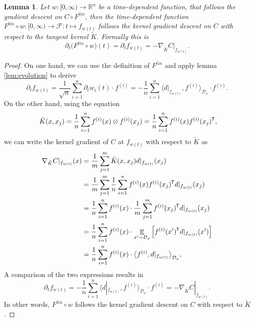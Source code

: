 \documentclass[11pt, a4paper]{article}
\newtheorem{lemma}[theorem]{Lemma}
\newcommand{\R}{\mathbb{R}}
\newcommand{\D}{\mathcal{D}}
\newcommand{\F}{\mathcal{F}}
\newcommand*{\tr}{^{\mkern-1.5mu\mathsf{T}}}
\DeclareMathOperator*{\E}{\mathbb{E}}
\begin{document}
\begin{lemma} \label{lem:tk}
Let $w: [0, \infty) \to \R^n$ be a time-dependent function, that follows the gradient descent on $C \circ F^\textit{lin}$, then the time-dependent function $F^\textit{lin} \circ w : [0, \infty) \to \F : t \mapsto f_{w(t)}$ follows the kernel gradient descent on $C$ with respect to the tangent kernel $\tilde{K}$. Formally this is
\[ \partial_t \big (F^\textit{lin} \circ w \big )(t) = \partial_tf_{w(t)} = -\nabla_{\tilde{K}}C|_{f_{w(t)}}. \]
\end{lemma}

\begin{proof}
On one hand, we can use the definition of $F^\textit{lin}$ and apply lemma \ref{lem:evolution} to derive
\[ \partial_tf_{w(t)} = \frac{1}{\sqrt{n}} \sum_{i=1}^{n} \partial_t w_i(t) \cdot f^{(i)} = - \frac{1}{n} \sum_{i=1}^{n} \big \langle d|_{f_{w(t)}}, f^{(i)} \big \rangle_{\D_x} \cdot f^{(i)}. \]
On the other hand, using the equation
\[ \tilde{K}(x,x_j) = \frac{1}{n} \sum_{i=1}^{n}f^{(i)}(x) \otimes f^{(i)}(x_j) = \frac{1}{n} \sum_{i=1}^{n}f^{(i)}(x) f^{(i)}(x_j) \tr, \]
we can write the kernel gradient of $C$ at $f_{w(t)}$ with respect to $\tilde{K}$ as
\[ \begin{split}
\nabla_{\tilde{K}} C|_{f_{w(t)}}(x)
&= \frac{1}{m} \sum_{j=1}^{m} \tilde{K}(x,x_j)d|_{f_{w(t)}}(x_j) \\\
&= \frac{1}{m} \sum_{j=1}^{m} \frac{1}{n} \sum_{i=1}^{n}f^{(i)}(x) f^{(i)}(x_j) \tr d|_{f_{w(t)}}(x_j) \\\
&= \frac{1}{n} \sum_{i=1}^{n} f^{(i)}(x) \cdot \frac{1}{m} \sum_{j=1}^{m} f^{(i)}(x_j) \tr  d|_{f_{w(t)}}(x_j) \\\
&= \frac{1}{n} \sum_{i=1}^{n} f^{(i)}(x) \cdot \E_{x' \sim \D_x} \Big [ f^{(i)}(x')\tr  d|_{f_{w(t)}}(x') \Big ] \\\
&= \frac{1}{n} \sum_{i=1}^{n} f^{(i)}(x) \cdot \big \langle f^{(i)}, d|_{f_{w(t)}} \big \rangle_{\D_x},
\end{split} \]
A comparison of the two expressions results in
\[ \partial_tf_{w(t)} = - \frac{1}{n} \sum_{i=1}^{n} \big \langle d|_{f_{w(t)}}, f^{(i)} \big \rangle_{\D_x} \cdot f^{(i)} = -\nabla_{\tilde{K}} C|_{f_{w(t)}}. \]
In other words, $F^\textit{lin} \circ w$ follows the kernel gradient descent on $C$ with respect to $\tilde{K}$.
\end{proof}
\end{document}
